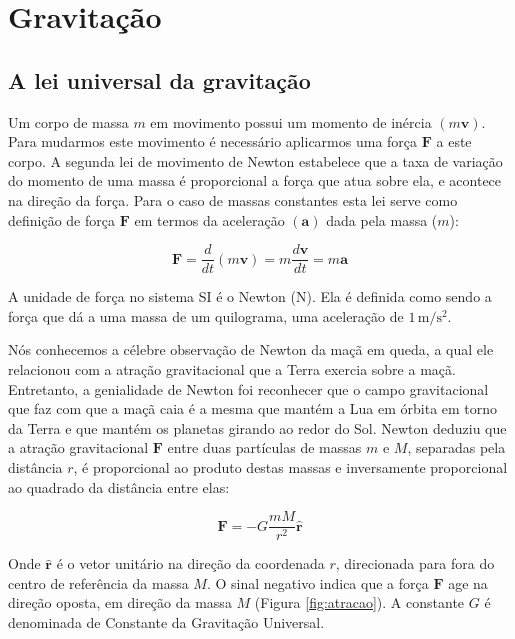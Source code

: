 \documentclass[]{book}
\theoremstyle{definition}
\theoremstyle{definition}
\theoremstyle{definition}
\theoremstyle{remark}
\begin{document}
\hypertarget{gravitacao}{%
\section{Gravitação}\label{gravitacao}}

\hypertarget{a-lei-universal-da-gravitacao}{%
\subsection{A lei universal da gravitação}\label{a-lei-universal-da-gravitacao}}

Um corpo de massa \(m\) em movimento possui um momento de inércia \((m\mathbf{v})\). Para mudarmos este movimento é necessário aplicarmos uma força \(\mathbf{F}\) a este corpo. A segunda lei de movimento de Newton estabelece que a taxa de variação do momento de uma massa é proporcional a força que atua sobre ela, e acontece na direção da força. Para o caso de massas constantes esta lei serve como definição de força \(\mathbf{F}\) em termos da aceleração \((\mathbf{a})\) dada pela massa (\(m\)):

\begin{equation}
\mathbf{F} = \frac{d}{dt} (m\mathbf{v}) = m \frac{d\mathbf{v}}{dt}= m \mathbf{a} \label{eq:0201}
\end{equation}

A unidade de força no sistema SI é o Newton (N). Ela é definida como sendo a força que dá a uma massa de um quilograma, uma aceleração de \(1\, \mathrm{m}/\mathrm{s}^2\).

Nós conhecemos a célebre observação de Newton da maçã em queda, a qual ele relacionou com a atração gravitacional que a Terra exercia sobre a maçã. Entretanto, a genialidade de Newton foi reconhecer que o campo gravitacional que faz com que a maçã caia é a mesma que mantém a Lua em órbita em torno da Terra e que mantém os planetas girando ao redor do Sol. Newton deduziu que a atração gravitacional \(\mathbf{F}\) entre duas partículas de massas \(m\) e \(M\), separadas pela distância \(r\), é proporcional ao produto destas massas e inversamente proporcional ao quadrado da distância entre elas:

\begin{equation}
\mathbf{F} = -G\frac{m M}{r^2} \hat{\mathbf{r}} \label{eq:0202}
\end{equation}

Onde \(\hat{\mathbf{r}}\) é o vetor unitário na direção da coordenada \(r\), direcionada para fora do centro de referência da massa \(M\). O sinal negativo indica que a força \(\mathbf{F}\) age na direção oposta, em direção da massa \(M\) (Figura \ref{fig:atracao}). A constante \(G\) é denominada de Constante da Gravitação Universal.
\end{document}
